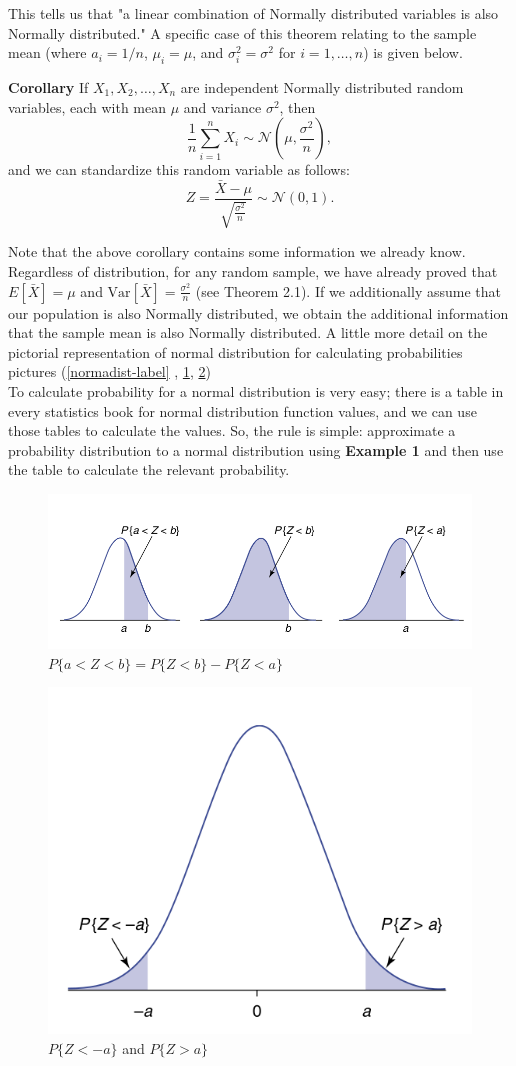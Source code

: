 \documentclass[12pt,a4paper]{article}
\theoremstyle{example}
\theoremstyle{definition}
\theoremstyle{theorem}
\begin{document}
This tells us that "a linear combination of Normally distributed variables is also Normally distributed." A specific case of this theorem relating to the sample mean (where \(a_i = 1/n\), \(\mu_i = \mu\), and \(\sigma_i^2 = \sigma^2\) for \(i = 1, \ldots, n\)) is given below.

\textbf{Corollary } If \(X_1, X_2, \ldots, X_n\) are independent Normally distributed random variables, each with mean \(\mu\) and variance \(\sigma^2\), then
\[
\frac{1}{n} \sum_{i=1}^{n} X_i \sim \mathcal{N}\left(\mu, \frac{\sigma^2}{n}\right),
\]
and we can standardize this random variable as follows:
\[
Z = \frac{\bar{X} - \mu}{\sqrt{\frac{\sigma^2}{n}}} \sim \mathcal{N}(0, 1).
\]

Note that the above corollary contains some information we already know. Regardless of distribution, for any random sample, we have already proved that \(E[\bar{X}] = \mu\) and \(\text{Var}[\bar{X}] = \frac{\sigma^2}{n}\) (see Theorem 2.1). If we additionally assume that our population is also Normally distributed, we obtain the additional information that the sample mean is also Normally distributed.
A little more detail on the pictorial representation of normal distribution for calculating probabilities
 pictures (\ref{normadist-label} , \ref{noraml exmaple}, \ref{avaluelabel})\\
To calculate probability for a normal distribution is very easy; there is a table in every statistics book for normal distribution function values, and we can use those tables to calculate the values. So, the rule is simple: approximate a probability distribution to a normal distribution using \textbf{Example 1} and then use the table to calculate the relevant probability.\citealp[pg-273]{ross2017introductory}
\begin{figure}
    \centering
    \includegraphics[width=.7\textwidth]{2023-11-13 15-40-54.png}
    \caption{$P\{a<Z<b\} = P \{Z < b\} - P \{Z < a\}$}
    \label{noraml exmaple}
\end{figure}
\begin{figure}
    \centering
    \includegraphics[width=.6\textwidth]{avalue.png}
    \caption{$P\{Z<-a\}$ and $P\{Z>a\}$}
    \label{avaluelabel}
\end{figure}
\end{document}
